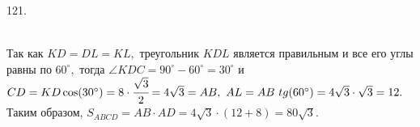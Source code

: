 121.\begin{figure}[ht!]
\end{figure}\\
Так как $KD=DL=KL,$ треугольник $KDL$ является правильным и все его углы равны по $60^\circ,$ тогда $\angle KDC=90^\circ-60^\circ=30^\circ$ и $CD=KD\cos(30^\circ)=8\cdot\cfrac{\sqrt{3}}{2}=4\sqrt{3}=AB,\ AL=AB\ tg(60^\circ)=4\sqrt{3}\cdot\sqrt{3}=12.$ Таким образом, $S_{ABCD}=AB\cdot AD=4\sqrt{3}\cdot(12+8)=80\sqrt{3}.$\\

